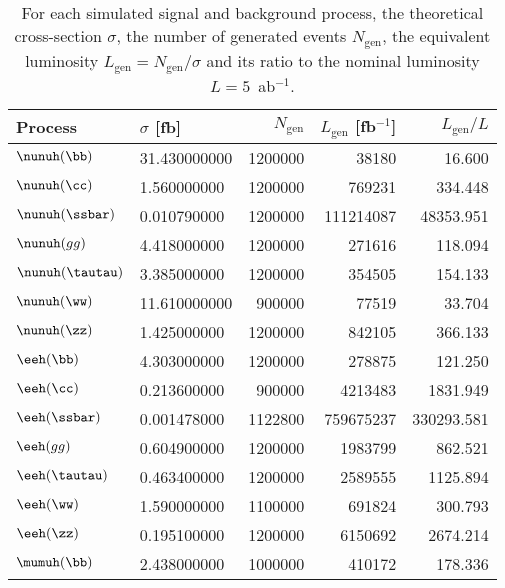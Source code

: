 \begin{table}[!htbp]
\centering
\caption{For each simulated signal and background process, the theoretical
cross-section $\sigma$, the number of generated events $N_\mathrm{gen}$,
the equivalent luminosity $L_\mathrm{gen} = N_\mathrm{gen}/\sigma$ and
its ratio to the nominal luminosity $L=5$~ab$^{-1}$.}
\label{tab:samples}
\begin{tabular}{llrrr}
\toprule
Process              &   $\sigma$ [fb] & $N_\mathrm{gen}$ & $L_\mathrm{gen}$ [fb$^{-1}$] & $L_\mathrm{gen}/L$ \\
\midrule
$\nunuh (\bb)$       &    31.430000000 &         1200000 &           38180 &          16.600 \\
$\nunuh (\cc)$       &     1.560000000 &         1200000 &          769231 &         334.448 \\
$\nunuh (\ssbar)$    &     0.010790000 &         1200000 &       111214087 &       48353.951 \\
$\nunuh (gg)$        &     4.418000000 &         1200000 &          271616 &         118.094 \\
$\nunuh (\tautau)$   &     3.385000000 &         1200000 &          354505 &         154.133 \\
$\nunuh (\ww)$       &    11.610000000 &          900000 &           77519 &          33.704 \\
$\nunuh (\zz)$       &     1.425000000 &         1200000 &          842105 &         366.133 \\
$\eeh (\bb)$         &     4.303000000 &         1200000 &          278875 &         121.250 \\
$\eeh (\cc)$         &     0.213600000 &          900000 &         4213483 &        1831.949 \\
$\eeh (\ssbar)$      &     0.001478000 &         1122800 &       759675237 &      330293.581 \\
$\eeh (gg)$          &     0.604900000 &         1200000 &         1983799 &         862.521 \\
$\eeh (\tautau)$     &     0.463400000 &         1200000 &         2589555 &        1125.894 \\
$\eeh (\ww)$         &     1.590000000 &         1100000 &          691824 &         300.793 \\
$\eeh (\zz)$         &     0.195100000 &         1200000 &         6150692 &        2674.214 \\
$\mumuh (\bb)$       &     2.438000000 &         1000000 &          410172 &         178.336 \\

\end{tabular}
\end{table}
